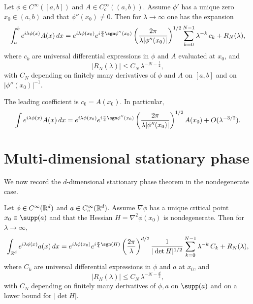 \begin{theorem}
\label{thm:J.sp1d}
Let $\phi\in C^\infty([a,b])$ and $A\in C_c^\infty((a,b))$.
Assume $\phi'$ has a unique zero $x_0\in(a,b)$ and that $\phi''(x_0)\neq 0$.
Then for $\lambda\to\infty$ one has the expansion
\begin{equation}\label{eq:J.sp1d.expansion}
\int_a^b e^{i\lambda\phi(x)}A(x)\,dx
=
e^{i\lambda\phi(x_0)}e^{i\frac{\pi}{4}\sgn\phi''(x_0)}
\left(\frac{2\pi}{\lambda|\phi''(x_0)|}\right)^{1/2}
\sum_{k=0}^{N-1}\lambda^{-k}\,c_k
+
R_N(\lambda),
\end{equation}
where $c_k$ are universal differential expressions in $\phi$ and $A$ evaluated at $x_0$, and
\begin{equation}\label{eq:J.sp1d.remainder}
|R_N(\lambda)|
\le
C_N\,\lambda^{-N-\frac12},
\end{equation}
with $C_N$ depending on finitely many derivatives of $\phi$ and $A$ on $[a,b]$ and on $|\phi''(x_0)|^{-1}$.
\end{theorem}

\begin{remark}
\label{rem:J.sp1d.leading}
The leading coefficient is $c_0=A(x_0)$.  In particular,
\[
\int e^{i\lambda\phi(x)}A(x)\,dx
=
e^{i\lambda\phi(x_0)}e^{i\frac{\pi}{4}\sgn\phi''(x_0)}
\left(\frac{2\pi}{\lambda|\phi''(x_0)|}\right)^{1/2}
A(x_0)
+
O(\lambda^{-3/2}).
\]
\end{remark}

\section{Multi-dimensional stationary phase}
\label{sec:J.md}

We now record the $d$-dimensional stationary phase theorem in the nondegenerate case.

\begin{theorem}
\label{thm:J.spd}
Let $\phi\in C^\infty(\mathbb{R}^d)$ and $a\in C_c^\infty(\mathbb{R}^d)$.
Assume $\nabla\phi$ has a unique critical point $x_0\in\supp(a)$ and that the Hessian
$H=\nabla^2\phi(x_0)$ is nondegenerate.
Then for $\lambda\to\infty$,
\begin{equation}\label{eq:J.spd.expansion}
\int_{\R^d} e^{i\lambda\phi(x)}a(x)\,dx
=
e^{i\lambda\phi(x_0)}e^{i\frac{\pi}{4}\sgn(H)}
\left(\frac{2\pi}{\lambda}\right)^{d/2}
\frac{1}{|\det H|^{1/2}}
\sum_{k=0}^{N-1}\lambda^{-k}\,C_k
+
R_N(\lambda),
\end{equation}
where $C_k$ are universal differential expressions in $\phi$ and $a$ at $x_0$, and
\begin{equation}\label{eq:J.spd.remainder}
|R_N(\lambda)|
\le
C_N\,\lambda^{-N-\frac{d}{2}},
\end{equation}
with $C_N$ depending on finitely many derivatives of $\phi,a$ on $\supp(a)$ and on a lower bound for
$|\det H|$.
\end{theorem}

